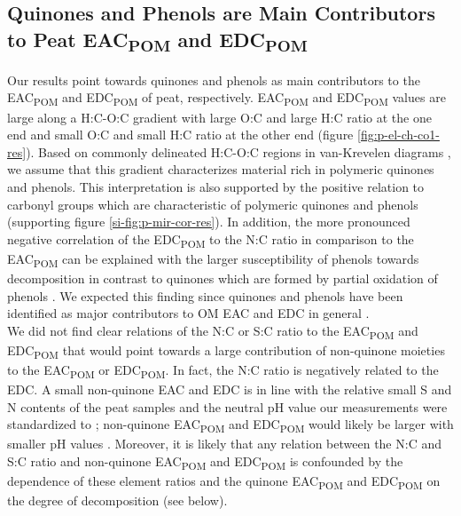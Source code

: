\documentclass[draft,linenumbers]{agujournal2018}
\begin{document}
\subsection{\texorpdfstring{Quinones and Phenols are Main Contributors
to Peat EAC\textsubscript{POM} and
EDC\textsubscript{POM}}{Quinones and Phenols are Main Contributors to Peat EAC and EDC}}

Our results point towards quinones and phenols as main contributors to
the EAC\textsubscript{POM} and EDC\textsubscript{POM} of peat,
respectively. EAC\textsubscript{POM} and EDC\textsubscript{POM} values
are large along a H:C-O:C gradient with large O:C and large H:C ratio at
the one end and small O:C and small H:C ratio at the other end (figure
\ref{fig:p-el-ch-co1-res}). Based on commonly delineated H:C-O:C regions
in van-Krevelen diagrams \citep{Kim.2003}, we assume that this gradient
characterizes material rich in polymeric quinones and phenols. This
interpretation is also supported by the positive relation to carbonyl
groups which are characteristic of polymeric quinones and phenols
\citep{ElMansouri.2007} (supporting figure \ref{si-fig:p-mir-cor-res}).
In addition, the more pronounced negative correlation of the
EDC\textsubscript{POM} to the N:C ratio in comparison to the
EAC\textsubscript{POM} can be explained with the larger susceptibility
of phenols towards decomposition in contrast to quinones which are
formed by partial oxidation of phenols
\citep{Fenner.2011, Aeschbacher.2012, Bolton.2018}. We expected this
finding since quinones and phenols have been identified as major
contributors to OM EAC and EDC in general
\citep{Ratasuk.2007, Aeschbacher.2010, Aeschbacher.2012}.\\
We did not find clear relations of the N:C or S:C ratio to the
EAC\textsubscript{POM} and EDC\textsubscript{POM} that would point
towards a large contribution of non-quinone moieties to the
EAC\textsubscript{POM} or EDC\textsubscript{POM}. In fact, the N:C ratio
is negatively related to the EDC. A small non-quinone EAC and EDC is in
line with the relative small S and N contents of the peat samples and
the neutral pH value our measurements were standardized to
\citep{Fimmen.2007, HernandezMontoya.2012}; non-quinone
EAC\textsubscript{POM} and EDC\textsubscript{POM} would likely be larger
with smaller pH values
\citep{Fimmen.2007, HernandezMontoya.2012, Aeschbacher.2012}. Moreover,
it is likely that any relation between the N:C and S:C ratio and
non-quinone EAC\textsubscript{POM} and EDC\textsubscript{POM} is
confounded by the dependence of these element ratios and the quinone
EAC\textsubscript{POM} and EDC\textsubscript{POM} on the degree of
decomposition \citep{Biester.2014} (see below).
\end{document}
